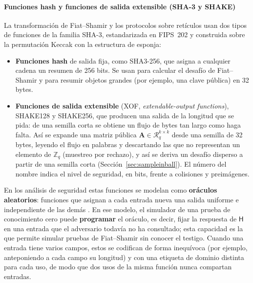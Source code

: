 \paragraph{Funciones hash y funciones de salida extensible (SHA-3 y SHAKE)}
\label{sec:xof}
La transformación de Fiat--Shamir y los protocolos sobre retículos usan dos tipos de funciones de la familia SHA-3, estandarizada en FIPS~202 \cite{nist2015fips202} y construida sobre la permutación Keccak con la estructura de esponja:
\begin{itemize}
    \item \textbf{Funciones hash} de salida fija, como SHA3-256, que asigna a cualquier cadena un resumen de 256 bits. Se usan para calcular el desafío de Fiat--Shamir y para resumir objetos grandes (por ejemplo, una clave pública) en 32 bytes.
    \item \textbf{Funciones de salida extensible} (XOF, \textit{extendable-output functions}), SHAKE128 y SHAKE256, que producen una salida de la longitud que se pida: de una semilla corta se obtiene un flujo de bytes tan largo como haga falta. Así se expande una matriz pública $\mathbf{A} \in \mathcal{R}_q^{k \times k}$ desde una semilla de 32 bytes, leyendo el flujo en palabras y descartando las que no representan un elemento de $\mathbb{Z}_q$ (muestreo por rechazo), y así se deriva un desafío disperso a partir de una semilla corta (Sección~\ref{sec:sampleinball}). El número del nombre indica el nivel de seguridad, en bits, frente a colisiones y preimágenes.
\end{itemize}
En los análisis de seguridad estas funciones se modelan como \textbf{oráculos aleatorios}: funciones que asignan a cada entrada nueva una salida uniforme e independiente de las demás \cite{bellare1993random}. En ese modelo, el simulador de una prueba de conocimiento cero puede \textbf{programar} el oráculo, es decir, fijar la respuesta de $\mathsf{H}$ en una entrada que el adversario todavía no ha consultado; esta capacidad es la que permite simular pruebas de Fiat--Shamir sin conocer el testigo. Cuando una entrada tiene varios campos, estos se codifican de forma inequívoca (por ejemplo, anteponiendo a cada campo su longitud) y con una etiqueta de dominio distinta para cada uso, de modo que dos usos de la misma función nunca compartan entradas.

